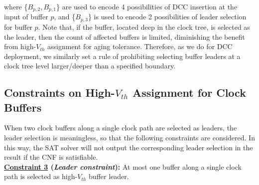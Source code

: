 \noindent where \{$B_{p,2}, B_{p,1}$\} are used to encode 4 possibilities of DCC insertion at the input of buffer $p$, and \{$B_{p,3}$\} is used to encode 2 possibilities of leader selection for buffer $p$.
Note that, if the buffer, located deep in the clock tree, is selected as the leader, then the count of affected buffers is limited, diminishing the benefit from high-$V_{th}$ assignment for aging tolerance. Therefore, as we do for DCC deployment, we similarly set a rule of prohibiting selecting buffer leaders at a clock tree level larger/deeper than a specified boundary.
\subsection{Constraints on High-$V_{th}$ Assignment for Clock Buffers}



When two clock buffers along a single clock path are selected as leaders, the leader selection is meaningless, so that the following constraints are considered. In this way, the SAT solver will not output the corresponding leader selection in the result if the CNF is satisfiable.\\

\noindent \textbf{\uline{Constraint 3} (\textit{Leader constraint}):} At most one buffer along a single clock path is selected as high-$V_{th}$ buffer leader.\\

